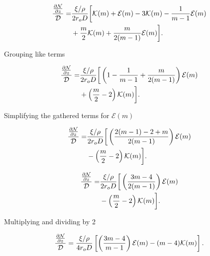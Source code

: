 \begin{equation}
    \begin{split}
        \frac{\frac{\partial \mathcal{N}}{\partial z}}{\mathcal{D}} =& \frac{\xi/\rho}{2r_o D} \bigg[ \mathcal{K}(m)+\mathcal{E}(m) - 3\mathcal{K}(m) - \frac{1}{m-1}\mathcal{E}(m)\\
         &+ \frac{m}{2}\mathcal{K}(m) + \frac{m}{2(m-1)} \mathcal{E}(m) \bigg].
\end{split}
\end{equation}

\noindent Grouping like terms

\begin{equation}
    \begin{split}
        \frac{\frac{\partial \mathcal{N}}{\partial z}}{\mathcal{D}} =& \frac{\xi/\rho}{2r_o D} \bigg[ \left(1- \frac{1}{m-1}+ \frac{m}{2(m-1)} \right)\mathcal{E}(m) \\
         &+ \left(\frac{m}{2}-2\right)\mathcal{K}(m) \bigg].
\end{split}
\end{equation}

\noindent Simplifying the gathered terms for \(\mathcal{E}(m)\)

\begin{equation}
    \begin{split}
        \frac{\frac{\partial \mathcal{N}}{\partial z}}{\mathcal{D}} =& \frac{\xi/\rho}{2r_o D} \bigg[ \left(\frac{2(m-1)- 2+ m}{2(m-1)} \right)\mathcal{E}(m) \\
         &- \left(\frac{m}{2}-2\right)\mathcal{K}(m) \bigg].
\end{split}
\end{equation}

\begin{equation}
    \begin{split}
        \frac{\frac{\partial \mathcal{N}}{\partial z}}{\mathcal{D}} =& \frac{\xi/\rho}{2r_o D} \bigg[ \left(\frac{3m-4}{2(m-1)} \right)\mathcal{E}(m) \\
         &- \left(\frac{m}{2}-2\right)\mathcal{K}(m) \bigg].
\end{split}
\end{equation}

\noindent Multiplying and dividing by 2

\begin{equation}
    \label{eqn:term1simple}
        \frac{\frac{\partial \mathcal{N}}{\partial z}}{\mathcal{D}} = \frac{\xi/\rho}{4 r_o D} \left[ \left(\frac{3m-4}{m-1} \right)\mathcal{E}(m) - (m-4)\mathcal{K}(m) \right].
\end{equation}

